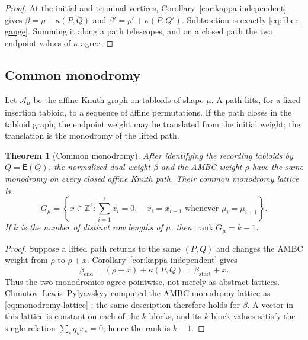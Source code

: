 \documentclass[11pt]{article}
\newtheorem{theorem}{Theorem}[section]
\theoremstyle{definition}
\theoremstyle{remark}
\newcommand{\Z}{\mathbb Z}
\newcommand{\E}{\mathsf E}
\newcommand{\A}{\mathcal A}
\begin{document}
\begin{proof}
At the initial and terminal vertices, Corollary~\ref{cor:kappa-independent} gives
\(\beta=\rho+\kappa(P,Q)\) and
\(\beta'=\rho'+\kappa(P,Q')\).  Subtraction is exactly
\eqref{eq:fiber-gauge}.  Summing it along a path telescopes, and on a closed path the two
endpoint values of \(\kappa\) agree.
\end{proof}

\subsection{Common monodromy}

Let \(\A_\mu\) be the affine Knuth graph on tabloids of shape \(\mu\).  A path lifts,
for a fixed insertion tabloid, to a sequence of affine permutations.  If the path closes
in the tabloid graph, the endpoint weight may be translated from the initial weight; the
translation is the monodromy of the lifted path.

\begin{theorem}[Common monodromy]\label{thm:monodromy}
After identifying the recording tabloids by \(\bar Q=\E(Q)\), the normalized dual weight
\(\beta\) and the AMBC weight \(\rho\) have the same monodromy on every closed affine
Knuth path.  Their common monodromy lattice is
\begin{equation}\label{eq:monodromy-lattice}
 G_\mu=
 \left\{x\in\Z^\ell:
   \sum_{i=1}^{\ell}x_i=0,
   \quad x_i=x_{i+1}\text{ whenever }\mu_i=\mu_{i+1}
 \right\}.
\end{equation}
If \(k\) is the number of distinct row lengths of \(\mu\), then
\(\operatorname{rank}G_\mu=k-1\).
\end{theorem}

\begin{proof}
Suppose a lifted path returns to the same \((P,Q)\) and changes the AMBC weight from
\(\rho\) to \(\rho+x\).  Corollary~\ref{cor:kappa-independent} gives
\[
 \beta_{\mathrm{end}}
   =(\rho+x)+\kappa(P,Q)
   =\beta_{\mathrm{start}}+x.
\]
Thus the two monodromies agree pointwise, not merely as abstract lattices.
Chmutov--Lewis--Pylyavskyy computed the AMBC monodromy lattice as
\eqref{eq:monodromy-lattice} \cite[Theorem~7.28]{CLP18}; the same description therefore
holds for \(\beta\).  A vector in this lattice is constant on each of the \(k\) blocks,
and its \(k\) block values satisfy the single relation
\(\sum_s q_sx_s=0\); hence the rank is \(k-1\).
\end{proof}
\end{document}
